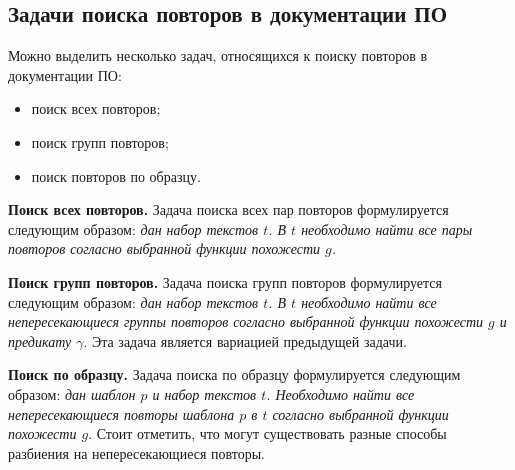 
\subsection{Задачи поиска повторов в документации ПО}

Можно выделить несколько задач, относящихся к поиску повторов в документации ПО:
\begin{itemize}
    \item поиск всех {повторов};
    \item поиск {групп повторов};
    \item поиск {повторов} по образцу.
\end{itemize}

\textbf{Поиск всех повторов.}
Задача поиска всех пар {повторов} формулируется следующим образом: \emph{дан набор текстов $t$. В $t$ необходимо найти все пары повторов  согласно выбранной функции похожести $g$.
}

\textbf{Поиск групп повторов.}
Задача поиска групп повторов формулируется следующим образом:
\emph{дан набор  текстов $t$. В $t$ необходимо найти все непересекающиеся группы повторов согласно выбранной функции похожести $g$ и предикату $\gamma$}.
Эта задача является вариацией предыдущей задачи.

\textbf{Поиск по образцу.}
Задача поиска по образцу формулируется следующим образом:
\emph{дан шаблон $p$ и набор текстов $t$. Необходимо найти все непересекающиеся повторы шаблона $p$ в  $t$ согласно выбранной функции похожести $g$}. Стоит отметить, что могут существовать разные способы разбиения на непересекающиеся повторы.












